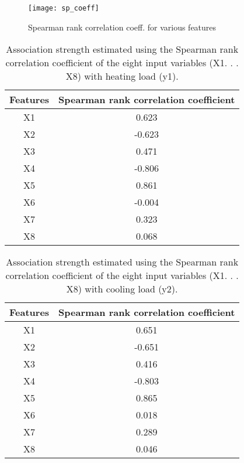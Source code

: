     \begin{figure}[h!]
      \centering
      \texttt{[image: sp\_coeff]}
      \caption{Spearman rank correlation coeff. for various features}
      \label{fig:sp_coeff}
    \end{figure}
    \newpage
    \begin{table}[h!]
          \centering
          \caption{Association strength estimated using the Spearman rank correlation coefficient of the eight input variables (X1. . . X8) with heating load (y1).}
          \label{tab:sprcoeffhl}
          \begin{tabular}{c|c}
            Features & Spearman rank correlation coefficient\\
            \hline
            X1 & 0.623 \\
            \hline
            X2 & -0.623 \\
            \hline
            X3 & 0.471 \\
            \hline
            X4 & -0.806 \\
            \hline
            X5 & 0.861 \\
            \hline
            X6 & -0.004 \\
            \hline
            X7 & 0.323 \\
            \hline
            X8 & 0.068 \\
            \hline
          \end{tabular}
    \end{table}
    
    \begin{table}[h!]
          \centering
          \caption{Association strength estimated using the Spearman rank correlation coefficient of the eight input variables (X1. . . X8) with cooling load (y2).}
          \label{tab:sprcoeffcl}
          \begin{tabular}{c|c}
            Features & Spearman rank correlation coefficient\\
            \hline
            X1 & 0.651 \\
            \hline
            X2 & -0.651 \\
            \hline
            X3 & 0.416 \\
            \hline
            X4 & -0.803 \\
            \hline
            X5 & 0.865 \\
            \hline
            X6 & 0.018 \\
            \hline
            X7 & 0.289 \\
            \hline
            X8 & 0.046 \\
            \hline
          \end{tabular}
    \end{table}
  
